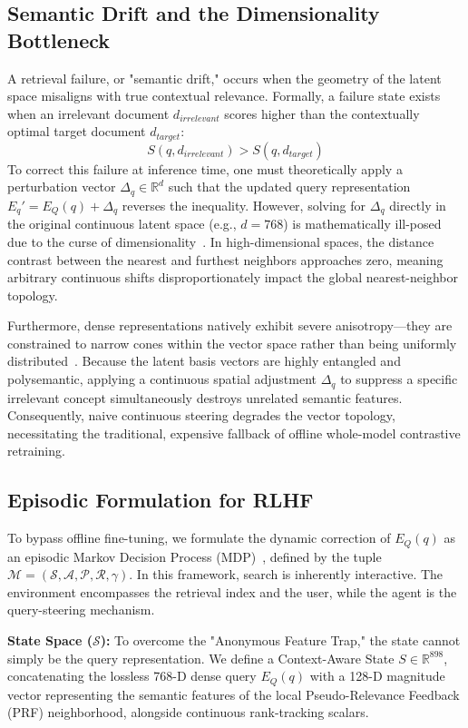 \subsection{Semantic Drift and the Dimensionality Bottleneck}
A retrieval failure, or "semantic drift," occurs when the geometry of the latent space misaligns with true contextual relevance. Formally, a failure state exists when an irrelevant document $d_{irrelevant}$ scores higher than the contextually optimal target document $d_{target}$:
\begin{equation}
S(q, d_{irrelevant}) > S(q, d_{target})
\end{equation}
To correct this failure at inference time, one must theoretically apply a perturbation vector $\Delta_q \in \mathbb{R}^d$ such that the updated query representation $E_q' = E_Q(q) + \Delta_q$ reverses the inequality. However, solving for $\Delta_q$ directly in the original continuous latent space (e.g., $d=768$) is mathematically ill-posed due to the curse of dimensionality~\citep{beyer1999}. In high-dimensional spaces, the distance contrast between the nearest and furthest neighbors approaches zero, meaning arbitrary continuous shifts disproportionately impact the global nearest-neighbor topology.

Furthermore, dense representations natively exhibit severe anisotropy—they are constrained to narrow cones within the vector space rather than being uniformly distributed~\citep{ethayarajh2019}. Because the latent basis vectors are highly entangled and polysemantic, applying a continuous spatial adjustment $\Delta_q$ to suppress a specific irrelevant concept simultaneously destroys unrelated semantic features. Consequently, naive continuous steering degrades the vector topology, necessitating the traditional, expensive fallback of offline whole-model contrastive retraining.

\subsection{Episodic Formulation for RLHF}
To bypass offline fine-tuning, we formulate the dynamic correction of $E_Q(q)$ as an episodic Markov Decision Process (MDP)~\citep{sutton2018}, defined by the tuple $\mathcal{M} = (\mathcal{S}, \mathcal{A}, \mathcal{P}, \mathcal{R}, \gamma)$. In this framework, search is inherently interactive. The environment encompasses the retrieval index and the user, while the agent is the query-steering mechanism.

\textbf{State Space ($\mathcal{S}$):} To overcome the "Anonymous Feature Trap," the state cannot simply be the query representation. We define a Context-Aware State $S \in \mathbb{R}^{898}$, concatenating the lossless 768-D dense query $E_Q(q)$ with a 128-D magnitude vector representing the semantic features of the local Pseudo-Relevance Feedback (PRF) neighborhood, alongside continuous rank-tracking scalars.

